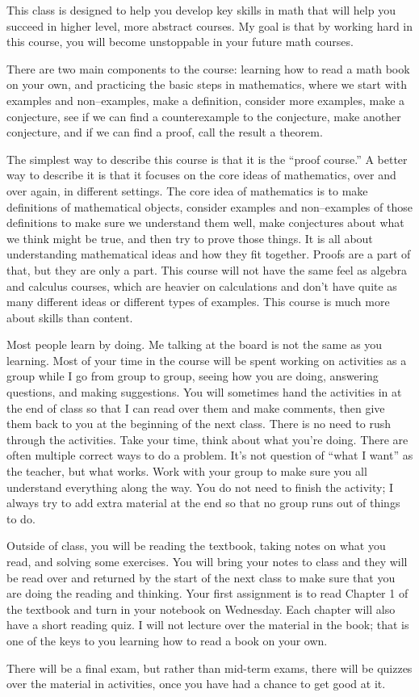 
This class is designed to help you develop key skills in math that will help you succeed in higher level, more abstract courses.
My goal is that by working hard in this course, you will become unstoppable in your future math courses.
\vskip 0.1in

There are two main components to the course:  learning how to read a math book on your own, and practicing the basic steps in mathematics, where we start with examples and non--examples, make a definition, consider more examples, make a conjecture, see if we can find a counterexample to the conjecture, make another conjecture, and if we can find a proof, call the result a theorem.
\vskip 0.1in

The simplest way to describe this course is that it is the ``proof course.''
A better way to describe it is that it focuses on the core ideas of mathematics, over and over again, in different settings.
The core idea of mathematics is to make definitions of mathematical objects, consider examples and non--examples of those definitions to make sure we understand them well, make conjectures about what we think might be true, and then try to prove those things.
It is all about understanding mathematical ideas and how they fit together.
Proofs are a part of that, but they are only a part.
This course will not have the same feel as algebra and calculus courses, which are heavier on calculations and don't have quite as many different ideas or different types of examples.
This course is much more about skills than content.
\vskip 0.1in

Most people learn by doing.
Me talking at the board is not the same as you learning.
Most of your time in the course will be spent working on activities as a group while I go from group to group, seeing how you are doing, answering questions, and making suggestions.
You will sometimes hand the activities in at the end of class so that I can read over them and make comments, then give them back to you at the beginning of the next class.
There is no need to rush through the activities.
Take your time, think about what you're doing.
There are often multiple correct ways to do a problem.
It's not question of ``what I want'' as the teacher, but what works.
Work with your group to make sure you all understand everything along the way.
You do not need to finish the activity; I always try to add extra material at the end so that no group runs out of things to do.
\vskip 0.1in

Outside of class, you will be reading the textbook, taking notes on what you read, and solving some exercises.
You will bring your notes to class and they will be read over and returned by the start of the next class to make sure that you are doing the reading and thinking.
Your first assignment is to read Chapter 1 of the textbook and turn in your notebook on Wednesday.
Each chapter will also have a short reading quiz.
I will not lecture over the material in the book; that is one of the keys to you learning how to read a book on your own.
\vskip 0.1in

There will be a final exam, but rather than mid-term exams, there will be quizzes over the material in activities, once you have had a chance to get good at it.
